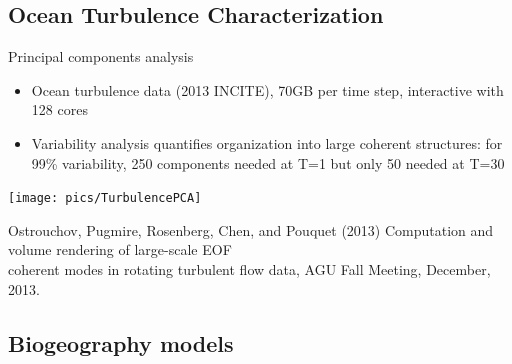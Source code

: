 \subsection{Ocean Turbulence Characterization}
\begin{frame}
  \begin{block}{Principal components analysis}
    \begin{itemize}\scriptsize
    \item Ocean turbulence data (2013 INCITE), 70GB per time step,
      interactive with 128 cores 
    \item Variability analysis quantifies organization into large
      coherent structures: for 99\% variability, 250 components needed at T=1
      but only 50 needed at T=30
    \end{itemize}
    \vspace{-3ex}
    \begin{center}
      \texttt{[image: pics/TurbulencePCA]}
    \end{center}
  \end{block}
  \begin{raggedright}\tiny
    Ostrouchov, Pugmire, Rosenberg, Chen, and Pouquet (2013)
    Computation and volume rendering of large-scale EOF \\[-2ex] coherent modes
    in rotating turbulent flow data, AGU Fall Meeting, December, 2013.
  \end{raggedright}
\end{frame}

\subsection{Biogeography models}

